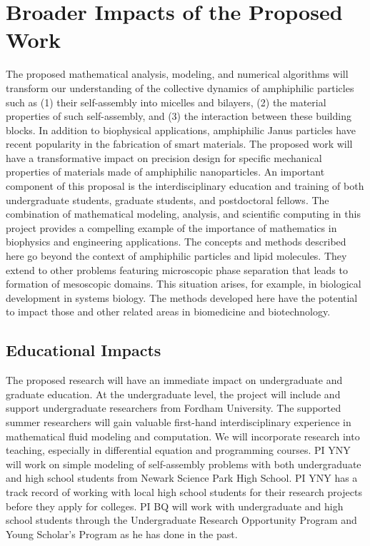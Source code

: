 \section{Broader Impacts of the Proposed Work}
\label{sec:BroaderImpacts}

The proposed mathematical analysis, modeling, and numerical algorithms
will transform our understanding of the collective dynamics of
amphiphilic particles such as (1) their self-assembly into micelles and
bilayers, (2) the material properties of such self-assembly, and (3) the
interaction between these building blocks. In addition to biophysical
applications, amphiphilic Janus particles have recent popularity in the
fabrication of smart materials. The proposed work will have a
transformative impact on precision design for specific mechanical
properties of materials made of amphiphilic nanoparticles. An important
component of this proposal is the interdisciplinary education and
training of both undergraduate students, graduate students, and
postdoctoral fellows. The combination of mathematical modeling,
analysis, and scientific computing in this project provides a compelling
example of the importance of mathematics in biophysics and engineering
applications. The concepts and methods described here go beyond the
context of amphiphilic particles and lipid molecules. They extend to
other problems featuring microscopic phase separation that leads to
formation of mesoscopic domains. This situation arises, for example, in
biological development in systems biology. The methods developed here
have the potential to impact those and other related areas in
biomedicine and biotechnology.

\subsection{Educational Impacts}
\label{subsec:Educational_plans}
The proposed research will have an immediate impact on undergraduate and
graduate education. At the undergraduate level, the project will include
and support undergraduate researchers from Fordham University. The
supported summer researchers will gain valuable first-hand
interdisciplinary experience in mathematical fluid modeling and
computation. We will incorporate research into teaching, especially in
differential equation and programming courses. PI YNY will work on
simple modeling of self-assembly problems with both undergraduate and
high school students from Newark Science Park High School. PI YNY has a
track record of working with local high school students for their
research projects before they apply for colleges. PI BQ will work with
undergraduate and high school students through the Undergraduate
Research Opportunity Program and Young Scholar's Program as he has done
in the past.

